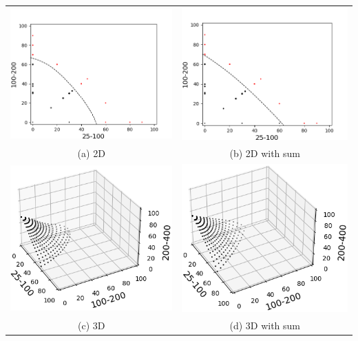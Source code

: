 \documentclass[10pt]{article}
\newenvironment{Figure}
  {\par\medskip\noindent\minipage{\linewidth}}
  {\endminipage\par\medskip}
\begin{document}
\begin{multicols}{2}
\begin{Figure}
  \begin{tabular}{cc}
    \includegraphics[width=0.45\columnwidth]{SV_2D.png} &   \includegraphics[width=0.45\columnwidth]{SV_2D_sum.png} \\
    (a) 2D & (b) 2D with sum \\[6pt]
    \includegraphics[width=0.45\columnwidth]{SV_3D.png} &   \includegraphics[width=0.45\columnwidth]{SV_3D_sum.png} \\
    (c) 3D & (d) 3D with sum \\[6pt]
  \end{tabular}
\end{Figure}


\end{multicols}
\end{document}

